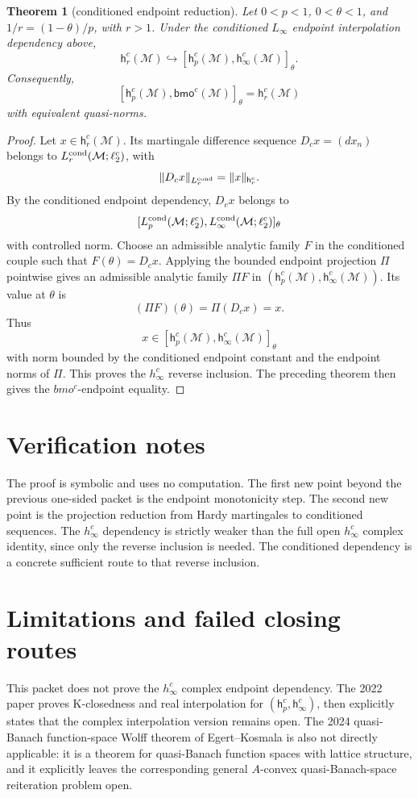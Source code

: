 \documentclass[11pt]{article}
\newcommand{\M}{\mathcal M}
\newcommand{\h}{\mathsf h}
\newcommand{\bmo}{\mathsf{bmo}}
\newtheorem{theorem}{Theorem}
\begin{document}
\begin{theorem}[conditioned endpoint reduction]
Let \(0<p<1\), \(0<\theta<1\), and \(1/r=(1-\theta)/p\), with \(r>1\). Under
the conditioned \(L_\infty\) endpoint interpolation dependency above,
\[
\h_r^c(\M)\hookrightarrow[\h_p^c(\M),\h_\infty^c(\M)]_\theta.
\]
Consequently,
\[
[\h_p^c(\M),\bmo^c(\M)]_\theta=\h_r^c(\M)
\]
with equivalent quasi-norms.
\end{theorem}

\begin{proof}
Let \(x\in\h_r^c(\M)\). Its martingale difference sequence
\(D_cx=(dx_n)\) belongs to \(L_r^{\rm cond}(\M;\ell_2^c)\), with
\[
\|D_cx\|_{L_r^{\rm cond}}=\|x\|_{\h_r^c}.
\]
By the conditioned endpoint dependency, \(D_cx\) belongs to
\[
[L_p^{\rm cond}(\M;\ell_2^c),
  L_\infty^{\rm cond}(\M;\ell_2^c)]_\theta
\]
with controlled norm. Choose an admissible analytic family \(F\) in the
conditioned couple such that \(F(\theta)=D_cx\). Applying the bounded endpoint
projection \(\Pi\) pointwise gives an admissible analytic family \(\Pi F\) in
\((\h_p^c(\M),\h_\infty^c(\M))\). Its value at \(\theta\) is
\[
(\Pi F)(\theta)=\Pi(D_cx)=x.
\]
Thus
\[
x\in[\h_p^c(\M),\h_\infty^c(\M)]_\theta
\]
with norm bounded by the conditioned endpoint constant and the endpoint norms
of \(\Pi\). This proves the \(h_\infty^c\) reverse inclusion. The preceding
theorem then gives the \(bmo^c\)-endpoint equality.
\end{proof}

\section*{Verification notes}

The proof is symbolic and uses no computation. The first new point beyond the
previous one-sided packet is the endpoint monotonicity step. The second new
point is the projection reduction from Hardy martingales to conditioned
sequences. The \(h_\infty^c\) dependency is strictly weaker than the full open
\(h_\infty^c\) complex identity, since only the reverse inclusion is needed.
The conditioned dependency is a concrete sufficient route to that reverse
inclusion.

\section*{Limitations and failed closing routes}

This packet does not prove the \(h_\infty^c\) complex endpoint dependency.
The 2022 paper \cite{Ran2022} proves K-closedness and real interpolation for
\((\h_p^c,\h_\infty^c)\), then explicitly states that the complex interpolation
version remains open. The 2024 quasi-Banach function-space Wolff theorem of
Egert--Kosmala \cite{EK2024} is also not directly applicable: it is a theorem
for quasi-Banach function spaces with lattice structure, and it explicitly
leaves the corresponding general \(A\)-convex quasi-Banach-space reiteration
problem open.
\end{document}
